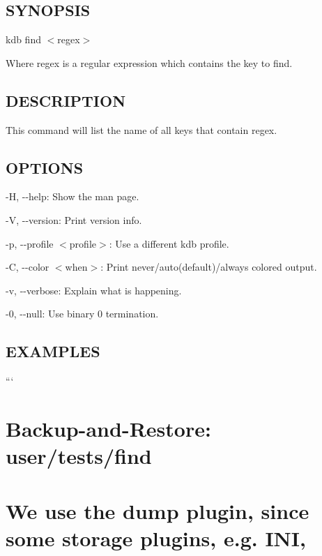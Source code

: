 \subsection*{S\+Y\+N\+O\+P\+S\+IS}

{\ttfamily kdb find $<$regex$>$}

Where {\ttfamily regex} is a regular expression which contains the key to find.

\subsection*{D\+E\+S\+C\+R\+I\+P\+T\+I\+ON}

This command will list the name of all keys that contain {\ttfamily regex}.

\subsection*{O\+P\+T\+I\+O\+NS}


\begin{DoxyItemize}
\item {\ttfamily -\/H}, {\ttfamily -\/-\/help}\+: Show the man page.
\item {\ttfamily -\/V}, {\ttfamily -\/-\/version}\+: Print version info.
\item {\ttfamily -\/p}, {\ttfamily -\/-\/profile $<$profile$>$}\+: Use a different kdb profile.
\item {\ttfamily -\/C}, {\ttfamily -\/-\/color $<$when$>$}\+: Print never/auto(default)/always colored output.
\item {\ttfamily -\/v}, {\ttfamily -\/-\/verbose}\+: Explain what is happening.
\item {\ttfamily -\/0}, {\ttfamily -\/-\/null}\+: Use binary 0 termination.
\end{DoxyItemize}

\subsection*{E\+X\+A\+M\+P\+L\+ES}

``` \section*{Backup-\/and-\/\+Restore\+: user/tests/find}

\section*{We use the {\ttfamily dump} plugin, since some storage plugins, e.\+g. I\+NI,}

